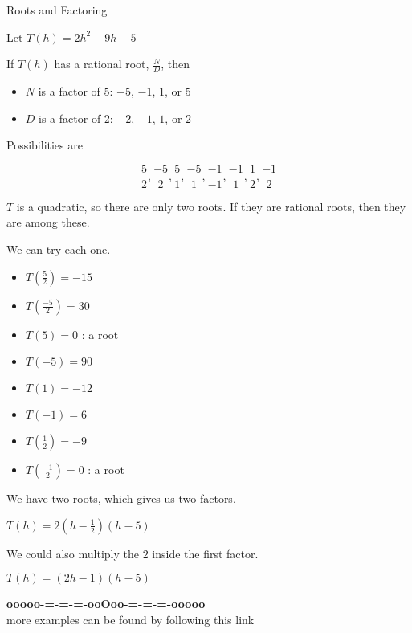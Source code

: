\documentclass{ximera}
\begin{document}
\begin{example}  Roots and Factoring


Let $T(h) = 2 h^2 - 9h - 5$



If $T(h)$ has a rational root, $\frac{N}{D}$, then


\begin{itemize}
\item $N$ is a factor of $5$: $-5$, $-1$, $1$, or $5$
\item $D$ is a factor of $2$: $-2$, $-1$, $1$, or $2$
\end{itemize}



Possibilities are 

\[  \frac{5}{2}, \frac{-5}{2}, \frac{5}{1}, \frac{-5}{1}, \frac{-1}{-1}, \frac{-1}{1}, \frac{1}{2}, \frac{-1}{2}   \]


$T$ is a quadratic, so there are only two roots. If they are rational roots, then they are among these.


We can try each one.



\begin{itemize}
\item $T\left( \frac{5}{2} \right) = -15$
\item $T\left( \frac{-5}{2} \right) = 30$
\item $T(5) = 0$   : a root
\item $T(-5) = 90$
\item $T(1) = -12$   
\item $T(-1) = 6$
\item $T\left( \frac{1}{2} \right) = -9$
\item $T\left( \frac{-1}{2} \right) = 0$ : a root
\end{itemize}

We have two roots, which gives us two factors.


$T(h) = 2\left(h-\frac{1}{2} \right)(h-5)$

We could also multiply the $2$ inside the first factor.


$T(h) = (2h - 1)(h-5)$



\end{example}










\begin{center}
\textbf{\textcolor{green!50!black}{ooooo-=-=-=-ooOoo-=-=-=-ooooo}} \\

more examples can be found by following this link\\ 

\end{center}
\end{document}
